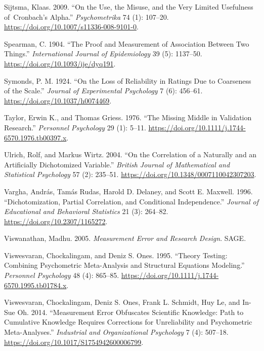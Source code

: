 \documentclass[
  letterpaper,
  DIV=11,
  numbers=noendperiod]{scrreprt}
\newlength{\cslhangindent}
\newlength{\cslentryspacingunit} %
\newenvironment{CSLReferences}[2] %
 {%
  \setlength{\parindent}{0pt}
  \ifodd #1
  \let\oldpar\par
  \def\par{\hangindent=\cslhangindent\oldpar}
  \fi
  \setlength{\parskip}{#2\cslentryspacingunit}
 }%
 {}
\begin{document}
\begin{CSLReferences}{1}{0}
\leavevmode{}%
Sijtsma, Klaas. 2009. {``On the Use, the Misuse, and the Very Limited
Usefulness of~Cronbach{'}s Alpha.''} \emph{Psychometrika} 74 (1):
107--20. \url{https://doi.org/10.1007/s11336-008-9101-0}.

\leavevmode{}%
Spearman, C. 1904. {``The Proof and Measurement of Association Between
Two Things.''} \emph{International Journal of Epidemiology} 39 (5):
1137--50. \url{https://doi.org/10.1093/ije/dyq191}.

\leavevmode{}%
Symonds, P. M. 1924. {``On the Loss of Reliability in Ratings Due to
Coarseness of the Scale.''} \emph{Journal of Experimental Psychology} 7
(6): 456--61. \url{https://doi.org/10.1037/h0074469}.

\leavevmode{}%
Taylor, Erwin K., and Thomas Griess. 1976. {``The Missing Middle in
Validation Research.''} \emph{Personnel Psychology} 29 (1): 5--11.
\url{https://doi.org/10.1111/j.1744-6570.1976.tb00397.x}.

\leavevmode{}%
Ulrich, Rolf, and Markus Wirtz. 2004. {``On the Correlation of a
Naturally and an Artificially Dichotomized Variable.''} \emph{British
Journal of Mathematical and Statistical Psychology} 57 (2): 235--51.
\url{https://doi.org/10.1348/0007110042307203}.

\leavevmode{}%
Vargha, András, Tamás Rudas, Harold D. Delaney, and Scott E. Maxwell.
1996. {``Dichotomization, Partial Correlation, and Conditional
Independence.''} \emph{Journal of Educational and Behavioral Statistics}
21 (3): 264--82. \url{https://doi.org/10.2307/1165272}.

\leavevmode{}%
Viswanathan, Madhu. 2005. \emph{Measurement Error and Research Design}.
SAGE.

\leavevmode{}%
Viswesvaran, Chockalingam, and Deniz S. Ones. 1995. {``Theory Testing:
Combining Psychometric Meta-Analysis and Structural Equations
Modeling.''} \emph{Personnel Psychology} 48 (4): 865--85.
\url{https://doi.org/10.1111/j.1744-6570.1995.tb01784.x}.

\leavevmode{}%
Viswesvaran, Chockalingam, Deniz S. Ones, Frank L. Schmidt, Huy Le, and
In-Sue Oh. 2014. {``Measurement Error Obfuscates Scientific Knowledge:
Path to Cumulative Knowledge Requires Corrections for Unreliability and
Psychometric Meta-Analyses.''} \emph{Industrial and Organizational
Psychology} 7 (4): 507--18.
\url{https://doi.org/10.1017/S1754942600006799}.


\end{CSLReferences}
\end{document}
